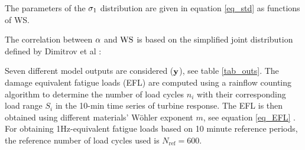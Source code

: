 \documentclass[preprint,12pt]{elsarticle}
\begin{document}

The parameters of the $\sigma_{1}$ distribution are given in equation \ref{eq_std} as functions of WS.



The correlation between $\alpha$ and $\text{WS}$ is based on the simplified joint distribution defined by Dimitrov et al \cite{dimitrov2015model}:



Seven different model outputs are considered ($\mathbf{y}$), see table \ref{tab_outs}. The damage equivalent fatigue loads (EFL) are computed using a rainflow counting algorithm to determine the number of load cycles $n_i$  with their corresponding load range $S_i$  in the 10-min time series of turbine response. The EFL is then obtained using different materials' W{\"o}hler exponent $m$, see equation \ref{eq_EFL} \cite{miner1945cumulative}. For obtaining 1Hz-equivalent fatigue loads based on 10 minute reference periods, the reference number of load cycles used is $N_{\text{ref}}=600$.

\end{document}
